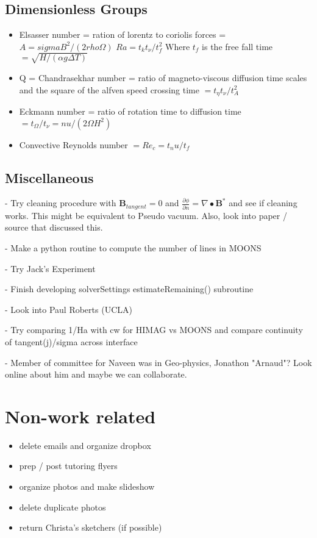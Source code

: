 \documentclass[11pt]{article}
\begin{document}
\subsection{Dimensionless Groups}
\begin{itemize}
\setlength\itemsep{-1em}
\item Elsasser number = ration of lorentz to coriolis forces = $A = sigma B^2 / (2 rho \Omega)$
$Ra = t_k t_{\nu} / t_f^2$ Where $t_f$ is the free fall time $ = \sqrt{ H/(\alpha g \Delta T)} $
\item Q = Chandrasekhar number = ratio of magneto-viscous diffusion time scales and the square of the alfven speed crossing time $ = t_{\eta} t_{\nu} / t_A^2$
\item Eckmann number = ratio of rotation time to diffusion time $ = t_{\Omega} / t_{\nu} = nu / (2 \Omega H^2)$
\item Convective Reynolds number $= Re_c = t_nu / t_f$
\end{itemize}


\subsection{Miscellaneous}

- Try cleaning procedure with $\mathbf{B}_{tangent}=0$ and $\frac{\partial \phi}{\partial n} = \nabla \bullet \mathbf{B}^*$ and see if cleaning works. This might be equivalent to Pseudo vacuum. Also, look into paper / source that discussed this.

- Make a python routine to compute the number of lines in MOONS

- Try Jack's Experiment

- Finish developing solverSettings estimateRemaining() subroutine

- Look into Paul Roberts (UCLA)

- Try comparing 1/Ha with cw for HIMAG vs MOONS and compare continuity of tangent(j)/sigma across interface

- Member of committee for Naveen was in Geo-physics, Jonathon "Arnaud"? Look online about him and maybe we can collaborate.

\newpage
\section{Non-work related}
\begin{itemize}
\setlength\itemsep{-1em}
\item delete emails and organize dropbox
\item prep / post tutoring flyers
\item organize photos and make slideshow
\item delete duplicate photos
\item return Christa's sketchers (if possible)
\end{itemize}
\end{document}
